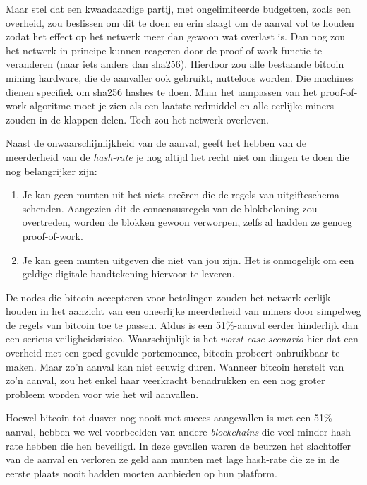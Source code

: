 Maar stel dat een kwaadaardige partij, met ongelimiteerde budgetten, zoals een overheid, zou beslissen om dit te doen en erin slaagt om de aanval vol te houden zodat het effect op het netwerk meer dan gewoon wat overlast is. Dan nog zou het netwerk in principe kunnen reageren door de proof-of-work functie te veranderen (naar iets anders dan sha256). Hierdoor zou alle bestaande bitcoin mining hardware, die de aanvaller ook gebruikt, nutteloos worden. Die machines dienen specifiek om sha256 hashes te doen. Maar het aanpassen van het proof-of-work algoritme moet je zien als een laatste redmiddel en alle eerlijke miners zouden in de klappen delen. Toch zou het netwerk overleven.

Naast de onwaarschijnlijkheid van de aanval, geeft het hebben van de meerderheid van de \textit{hash-rate} je nog altijd het recht niet om dingen te doen die nog belangrijker zijn:

\begin{enumerate}
    \item Je kan geen munten uit het niets creëren die de regels van uitgifteschema schenden. Aangezien dit de consensusregels van de blokbeloning zou overtreden, worden de blokken gewoon verworpen, zelfs al hadden ze genoeg proof-of-work.
    \item Je kan geen munten uitgeven die niet van jou zijn. Het is onmogelijk om een geldige digitale handtekening hiervoor te leveren.
\end{enumerate}

De nodes die bitcoin accepteren voor betalingen zouden het netwerk eerlijk houden in het aanzicht van een oneerlijke meerderheid van miners door simpelweg de regels van bitcoin toe te passen. Aldus is een 51\%-aanval eerder hinderlijk dan een serieus veiligheidsrisico. Waarschijnlijk is het \textit{worst-case scenario} hier dat een overheid met een goed gevulde portemonnee, bitcoin probeert onbruikbaar te maken. Maar zo’n aanval kan niet eeuwig duren. Wanneer bitcoin herstelt van zo'n aanval, zou het enkel haar veerkracht benadrukken en een nog groter probleem worden voor wie het wil aanvallen.

Hoewel bitcoin tot dusver nog nooit met succes aangevallen is met een 51\%-aanval, hebben we wel voorbeelden van andere \textit{blockchains} die veel minder hash-rate hebben die hen beveiligd. In deze gevallen waren de beurzen het slachtoffer van de aanval en verloren ze geld aan munten met lage hash-rate die ze in de eerste plaats nooit hadden moeten aanbieden op hun platform.

